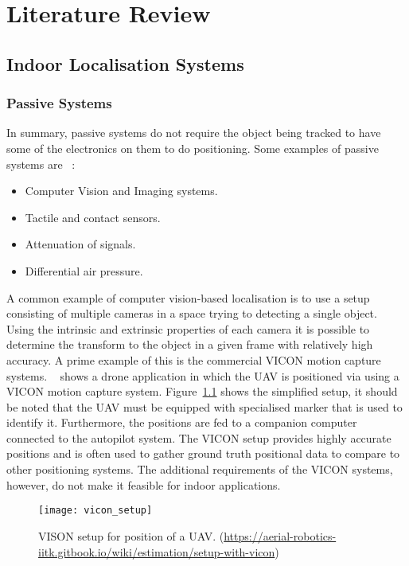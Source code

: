 \chapter{Literature Review}\label{ch:literature-review}
\section{Indoor Localisation Systems}\label{sec:indoor-localisation-sensors}
\subsection{Passive Systems}\label{subsec:passive-systems}
In summary, passive systems do not require the object being tracked to have some of the electronics on them to do positioning.
Some examples of passive systems are ~\citep{deak2012survey}:
\begin{itemize}
    \item Computer Vision and Imaging systems.
    \item Tactile and contact sensors.
    \item Attenuation of signals.
    \item Differential air pressure.
\end{itemize}
A common example of computer vision-based localisation is to use a setup consisting of multiple cameras in a space trying to detecting a single object.
Using the intrinsic and extrinsic properties of each camera it is possible to determine the transform to the object in a given frame with relatively high accuracy.
A prime example of this is the commercial VICON motion capture systems.
~\cite{aerialrobotsiitk} shows a drone application in which the UAV is positioned via using a VICON motion capture system.
Figure~\ref{fig:vs} shows the simplified setup, it should be noted that the UAV must be equipped with specialised marker that is used to identify it.
Furthermore, the positions are fed to a companion computer connected to the autopilot system.
The VICON setup provides highly accurate positions and is often used to gather ground truth positional data to compare to other positioning systems.
The additional requirements of the VICON systems, however, do not make it feasible for indoor applications.

\begin{figure}[h!]
    \centering
    \texttt{[image: vicon\_setup]}
    \caption{VISON setup for position of a UAV. (\url{https://aerial-robotics-iitk.gitbook.io/wiki/estimation/setup-with-vicon})}
    \label{fig:vs}
\end{figure}

